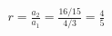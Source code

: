 \documentclass[preview]{standalone}
\begin{document}
\begin{align*}
r = \frac{a_2}{a_1} = \frac{16/15}{4/3} = \frac{4}{5}
\end{align*}
\end{document}
